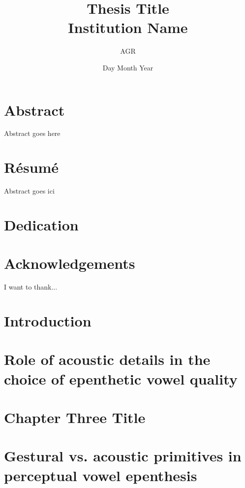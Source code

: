 \documentclass[12pt, twoside]{report}
\title{
	{Thesis Title}\\
	{\large Institution Name}\\
}
\author{AGR}
\date{Day Month Year}
\begin{document}
\maketitle

\chapter*{Abstract}
Abstract goes here

\chapter*{Résumé}
Abstract goes ici

\chapter*{Dedication}


\chapter*{Acknowledgements}
I want to thank...

\tableofcontents

\chapter{Introduction}


\chapter{Role of acoustic details in the choice of epenthetic vowel quality}


\chapter{Chapter Three Title}


\chapter{{\color{red}Gestural vs. acoustic primitives in perceptual vowel epenthesis}}

\end{document}
